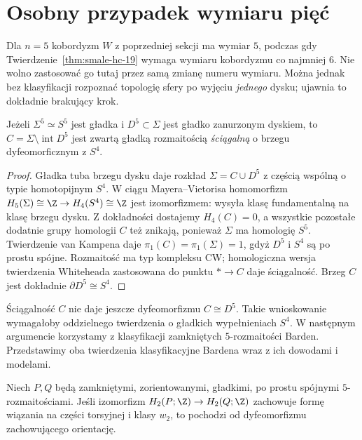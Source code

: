 \section{Osobny przypadek wymiaru pięć}
\label{sec:poincare-five}

Dla $n=5$ kobordyzm $W$ z poprzedniej
sekcji ma wymiar $5$, podczas gdy
Twierdzenie~\ref{thm:smale-hc-19}
wymaga wymiaru kobordyzmu co najmniej $6$.
Nie wolno zastosować go tutaj przez
samą zmianę numeru wymiaru.
Można jednak bez klasyfikacji rozpoznać
topologię sfery po wyjęciu \emph{jednego}
dysku; ujawnia to dokładnie brakujący krok.

\begin{lemat}
\label{lem:punctured-five-24}
Jeżeli $\Sigma^5\simeq S^5$ jest gładka
i $D^5\subset\Sigma$ jest gładko zanurzonym
dyskiem, to
$C=\Sigma\setminus\operatorname{int}D^5$
jest zwartą gładką rozmaitością
\emph{ściągalną} o brzegu dyfeomorficznym
z $S^4$.
\end{lemat}
\begin{proof}
Gładka tuba brzegu dysku daje rozkład
$\Sigma=C\cup D^5$ z częścią wspólną
o typie homotopijnym $S^4$.
W ciągu Mayera--Vietorisa homomorfizm
$H_5(\Sigma)\cong\Z\to H_4(S^4)\cong\Z$
jest izomorfizmem: wysyła klasę
fundamentalną na klasę brzegu dysku.
Z dokładności dostajemy $H_4(C)=0$,
a wszystkie pozostałe dodatnie grupy
homologii $C$ też znikają, ponieważ
$\Sigma$ ma homologię $S^5$.
Twierdzenie van Kampena daje
$\pi_1(C)=\pi_1(\Sigma)=1$,
gdyż $D^5$ i $S^4$ są po prostu spójne.
Rozmaitość ma typ kompleksu CW;
homologiczna wersja twierdzenia
Whiteheada zastosowana do
punktu $*\to C$ daje ściągalność.
Brzeg $C$ jest dokładnie
$\partial D^5\cong S^4$.
\end{proof}

Ściągalność $C$ nie daje jeszcze
dyfeomorfizmu $C\cong D^5$.
Takie wnioskowanie wymagałoby
oddzielnego twierdzenia o gładkich
wypełnieniach $S^4$. W następnym
argumencie korzystamy z klasyfikacji
zamkniętych $5$-rozmaitości Barden.
Przedstawimy oba twierdzenia klasyfikacyjne
Bardena wraz z ich dowodami i modelami.

\begin{twierdzenie}
\label{thm:Barden-5-24}
Niech $P,Q$ będą zamkniętymi, zorientowanymi,
gładkimi, po prostu spójnymi
$5$-rozmaitościami. Jeśli izomorfizm
$H_2(P;\Z)\to H_2(Q;\Z)$ zachowuje
formę wiązania na części torsyjnej
i klasy $w_2$, to pochodzi od
dyfeomorfizmu zachowującego orientację.
\end{twierdzenie}

